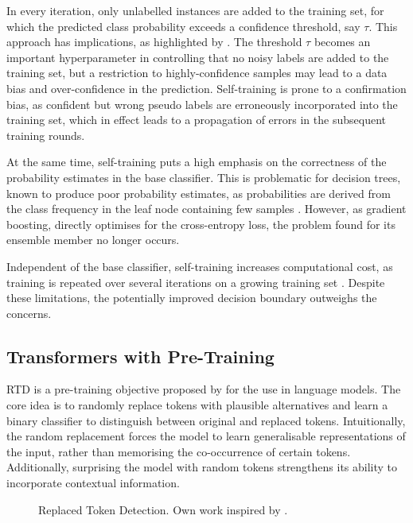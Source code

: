 In every iteration, only unlabelled instances are added to the training set, for which the predicted class probability exceeds a confidence threshold, say $\tau$. This approach has implications, as highlighted by \textcite[][2]{chenDebiasedSelfTrainingSemiSupervised2022}. The threshold $\tau$ becomes an important hyperparameter in controlling that no noisy labels are added to the training set, but a restriction to highly-confidence samples may lead to a data bias and over-confidence in the prediction. Self-training is prone to a confirmation bias, as confident but wrong pseudo labels are erroneously incorporated into the training set, which in effect leads to a propagation of errors in the subsequent training rounds.

At the same time, self-training puts a high emphasis on the correctness of the probability estimates in the base classifier. This is problematic for decision trees, known to produce poor probability estimates, as probabilities are derived from the class frequency in the leaf node containing few samples \autocite[][357--358]{tanhaSemisupervisedSelftrainingDecision2017}. However, as gradient boosting, directly optimises for the cross-entropy loss, the problem found for its ensemble member no longer occurs.

Independent of the base classifier, self-training increases computational cost, as training is repeated over several iterations on a growing training set \autocite[][9]{zophRethinkingPretrainingSelftraining2020}. Despite these limitations, the potentially improved decision boundary outweighs the concerns.

\subsection{Transformers with Pre-Training}\label{sec:extensions-to-transformer}

\gls{RTD} is a pre-training objective proposed by \textcite[][2--3]{clarkElectraPretrainingText2020} for the use in language models. The core idea is to randomly replace tokens with plausible alternatives and learn a binary classifier to distinguish between original and replaced tokens. Intuitionally, the random replacement forces the model to learn generalisable representations of the input, rather than memorising the co-occurrence of certain tokens. Additionally, surprising the model with random tokens strengthens its ability to incorporate contextual information.

\begin{figure}[ht]
    \centering
    {\renewcommand\normalsize{\small}
        \normalsize
        }
    \caption[Replaced Token Detection]{Replaced Token Detection. Own work inspired by \autocite[][2--3]{clarkElectraPretrainingText2020}.}
    \label{fig:random-token-replacement}
\end{figure}

